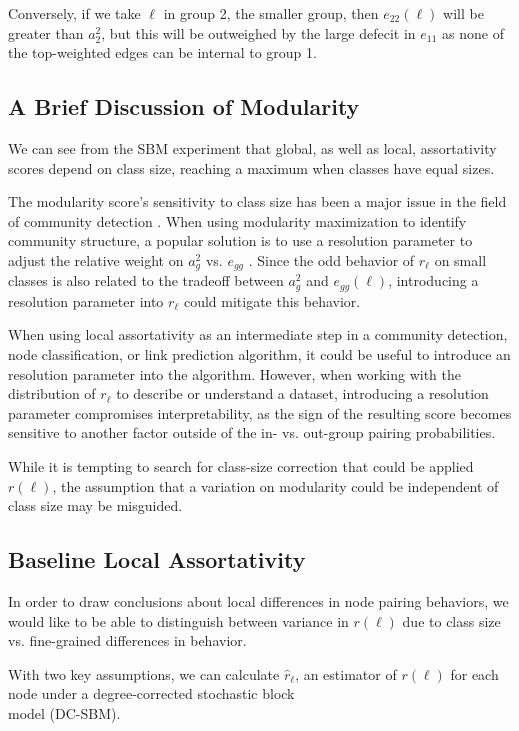 \documentclass[12pt]{article}
\begin{document}
Conversely, if we take $\ell$ in group 2, the smaller group, then $e_{22}(\ell)$ will be greater than $a_2^2$, but this will be outweighed by the large defecit in $e_{11}$ as none of the top-weighted edges can be internal to group 1.

\subsection{A Brief Discussion of Modularity}

We can see from the SBM experiment that global, as well as local, assortativity scores depend on class size, reaching a maximum when classes have equal sizes.  

The modularity score's sensitivity to class size has been a major issue in the field of community detection \cite{Fortunato36}.  When using modularity maximization to identify community structure, a popular solution is to use a resolution parameter to adjust the relative weight on $a_g^2$ vs. $e_{gg}$ \cite{newman:2016}.  Since the odd behavior of $r_\ell$ on small classes is also related to the tradeoff between $a_g^2$ and $e_{gg}(\ell)$, introducing a resolution parameter into $r_\ell$ could mitigate this behavior.

When using local assortativity as an intermediate step in a community detection, node classification, or link prediction algorithm, it could be useful to introduce an resolution parameter into the algorithm.  However, when working with the distribution of $r_\ell$ to describe or understand a dataset, introducing a resolution parameter compromises interpretability, as the sign of the resulting score becomes sensitive to another factor outside of the in- vs. out-group pairing probabilities.

While it is tempting to search for class-size correction that could be applied $r(\ell)$, the assumption that a variation on modularity could be independent of class size may be misguided.

\subsection{Baseline Local Assortativity}

In order to draw conclusions about local differences in node pairing behaviors, we would like to be able to distinguish between variance in $r(\ell)$ due to class size vs. fine-grained differences in behavior.  

With two key assumptions, we can calculate $\hat{r}_\ell$, an estimator of $r(\ell)$ for each node under a degree-corrected stochastic block \\model (DC-SBM).
\end{document}
